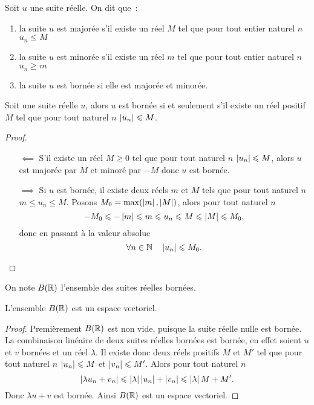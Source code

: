\begin{defdef}
  Soit $u$ une suite réelle. On dit que~:
  \begin{enumerate}
  \item la suite $u$ est majorée s'il existe un réel $M$ tel que pour tout entier naturel $n$ $u_n\leqslant M$
  \item la suite $u$ est minorée s'il existe un réel $m$ tel que pour tout entier naturel $n$ $u_n\geqslant m$
  \item la suite $u$ est bornée si elle est majorée et minorée.
  \end{enumerate}
\end{defdef}
\begin{prop}
  Soit une suite réelle $u$, alors $u$ est bornée si et seulement s'il existe un réel positif $M$ tel que pour tout naturel $n$ $\left\lvert u_n\right\rvert\leqslant M$.
\end{prop}
\begin{proof}
  \begin{itemize}
  \item[$\impliedby$] S'il existe un réel $M\geqslant 0$ tel que pour tout naturel $n$ $\left\lvert u_n\right\rvert\leqslant M$, alors $u$ est majorée par $M$ et minoré par $-M$ donc $u$ est bornée.
  \item[$\implies$] Si $u$ est bornée, il existe deux réels $m$ et $M$ tels que pour tout naturel $n$ $m\leqslant u_n \leqslant M$. Posons $M_0=\max(\left\lvert m\right\rvert,\left\lvert M\right\rvert)$, alors pour tout naturel $n$
    \begin{equation}
      -M_0\leqslant -\left\lvert m\right\rvert \leqslant m\leqslant u_n\leqslant M\leqslant \left\lvert M\right\rvert\leqslant M_0,
    \end{equation}
    donc en passant à la valeur absolue
    \begin{equation}
      \forall n \in \mathbb{N} \quad \left\lvert u_n\right\rvert\leqslant M_0.
    \end{equation}
  \end{itemize}
\end{proof}
On note $B(\mathbb{R})$ l'ensemble des suites réelles bornées.
\begin{prop}
  L'ensemble $B(\mathbb{R})$ est un espace vectoriel.
\end{prop}
\begin{proof}
  Premièrement $B(\mathbb{R})$ est non vide, puisque la suite réelle nulle est bornée. La combinaison linéaire de deux suites réelles bornées est bornée, en effet soient $u$ et $v$ bornées et un réel $\lambda$. Il existe donc deux réels positifs $M$ et $M'$ tel que pour tout naturel $n$ $\left\lvert u_n\right\rvert\leqslant M$ et $\left\lvert v_n\right\rvert\leqslant M'$. Alors pour tout naturel $n$
  \begin{equation}
    \left\lvert\lambda u_n + v_n\right\rvert\leqslant \left\lvert\lambda\right\rvert\left\lvert u_n\right\rvert+\left\lvert v_n\right\rvert\leqslant \left\lvert\lambda\right\rvert M+M'.
  \end{equation}
Donc $\lambda u+v$ est bornée. Ainsi $B(\mathbb{R})$ est un espace vectoriel.
\end{proof}
